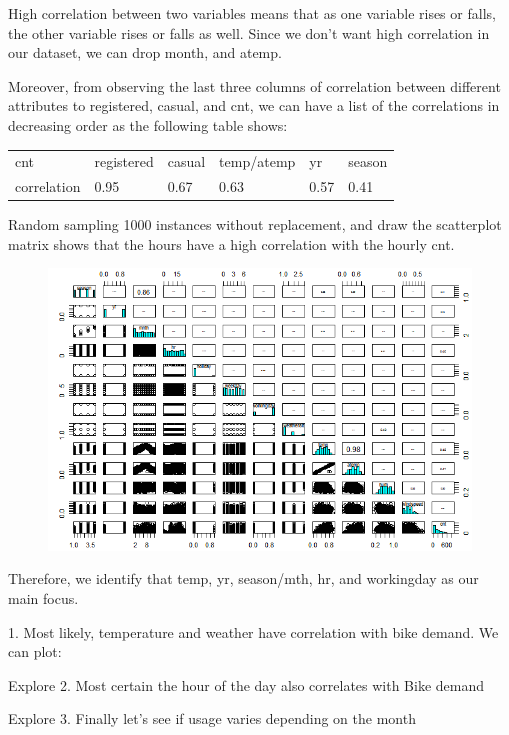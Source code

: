 \documentclass[12pt]{article}
\begin{document}
High correlation between two variables means that as one variable rises or falls, the other variable rises or falls as well. Since we don't want high correlation in our dataset, we can drop month, and atemp.

Moreover, from observing the last three columns of correlation between different attributes to registered, casual, and cnt, we can have a list of the correlations in decreasing order as the following table shows: 
\begin{table}[H]
	\begin{tabular}{| l | l | l | l | l | l|}
		cnt~ & registered & casual & temp/atemp & yr & season\\
		correlation & 0.95 & 0.67 & 0.63 & 0.57 & 0.41\\
		\hline
	\end{tabular}
\end{table}
Random sampling 1000 instances without replacement, and draw the scatterplot matrix shows that the hours have a high correlation with the hourly cnt. 
\begin{figure}[H]
	\includegraphics[scale=0.8]{figures/scatterplot_col_season.png}
	\end{figure}

Therefore, we identify that temp, yr, season/mth, hr, and workingday as our main focus.

1. Most likely, temperature and weather have correlation with bike demand. We can plot:

Explore 2. Most certain the hour of the day also correlates with Bike demand 

Explore 3. Finally let’s see if usage varies depending on the month 
\end{document}
